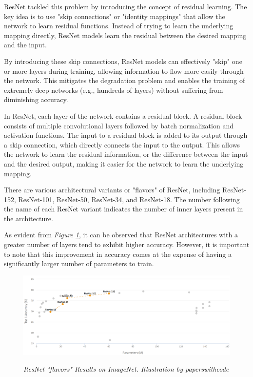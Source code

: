 ResNet tackled this problem by introducing the concept of residual learning.
The key idea is to use "skip connections" or "identity mappings" that allow the
network to learn residual functions. Instead of trying to learn the underlying
mapping directly, ResNet models learn the residual between the desired mapping
and the input. \newline

By introducing these skip connections, ResNet models can effectively "skip" one
or more layers during training, allowing information to flow more easily
through the network. This mitigates the degradation problem and enables the
training of extremely deep networks (e.g., hundreds of layers) without
suffering from diminishing accuracy. \newline

In ResNet, each layer of the network contains a residual block. A residual
block consists of multiple convolutional layers followed by batch normalization
and activation functions. The input to a residual block is added to its output
through a skip connection, which directly connects the input to the output.
This allows the network to learn the residual information, or the difference
between the input and the desired output, making it easier for the network to
learn the underlying mapping.  \newline

There are various architectural variants or "flavors" of ResNet, including
ResNet-152,  ResNet-101,  ResNet-50,  ResNet-34, and  ResNet-18. The
number following the name of each ResNet variant indicates the number of inner
layers present in the architecture.

\newpage

As evident from \textit{Figure \ref{fig:resnet}}, it can be observed that
ResNet architectures with a greater number of layers tend to exhibit higher
accuracy. However, it is important to note that this improvement in accuracy
comes at the expense of having a significantly larger number of parameters to
train.


\begin{figure}[H]
  \begin{adjustbox}{width=\textwidth, trim={0pt 0pt 1cm 0pt}, clip}
    \centering
    \includegraphics[width=\textwidth]{imatges/preliminaries/ResNetImageNet.png}
  \end{adjustbox}
  \caption[ResNet "flavors" Results on ImageNet]{\textit{ResNet "flavors" Results on ImageNet. Illustration by paperswithcode}}
  {\label{fig:resnet}}
\end{figure}

